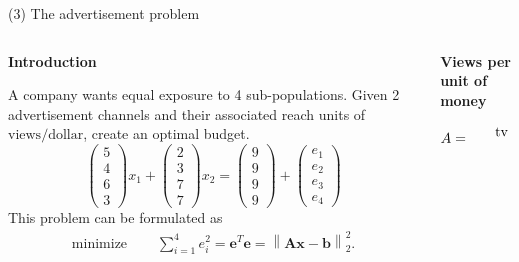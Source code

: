 \documentclass[11pt, aspectratio=149]{beamer}
\theoremstyle{plain}
\newcommand{\norm}[1]{\left\lVert#1\right\rVert}
\begin{document}

\begin{frame}[fragile, t]{(3) The advertisement problem}
	\begin{columns}
		\begin{column}{0.6\textwidth}
			\textbf{Introduction}\\ \vspace*{0.5em} 
			
			A company wants equal exposure to 4 sub-populations.
			Given 2 advertisement channels and their associated reach units of $\text{views} / \text{dollar}$, create an optimal budget.
			\begin{equation*}
				\begin{pmatrix}
				5\\ 
				4\\ 
				6\\ 
				3
				\end{pmatrix}
				x_1
				+
				\begin{pmatrix}
				2\\ 
				3\\ 
				7\\ 
				7
				\end{pmatrix}
				x_2
				=
				\begin{pmatrix}
				9 \\ 
				9\\ 
				9\\ 
				9
				\end{pmatrix}
				+
				\begin{pmatrix}
				e_1 \\ 
				e_2\\ 
				e_3\\ 
				e_4
				\end{pmatrix}
			\end{equation*}
			This problem can be formulated as
			\begin{align*}
			\text{minimize } \quad & \sum_{i=1}^{4} e_i^2 
			=  	\mathbf{e}^T \mathbf{e}	= \norm{ \mathbf{A} \mathbf{x} - \mathbf{b} }_2^2.
			\end{align*}
		\end{column}
		\begin{column}{0.4\textwidth}%
			\begin{center}
				\textbf{Views per unit of money}
			\end{center}
			\[
			A = 
			\begin{blockarray}{rcc}
			& \text{tv} & \text{paper}  \\

\end{blockarray}\]
\end{column}
\end{columns}
\end{frame}
\end{document}
